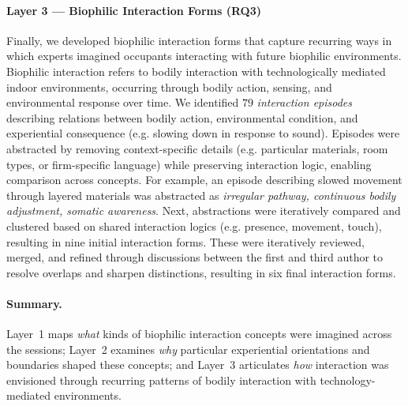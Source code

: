 \paragraph{Layer 3 — Biophilic Interaction Forms (RQ3)}
\label{subsec:ch5-layer3}
Finally, we developed biophilic interaction forms that capture recurring ways in which experts imagined occupants interacting with future biophilic environments. Biophilic interaction refers to bodily interaction with technologically mediated indoor environments, occurring through bodily action, sensing, and environmental response over time. We identified $79$ \emph{interaction episodes} describing relations between bodily action, environmental condition, and experiential consequence (e.g. slowing down in response to sound). Episodes were abstracted by removing context-specific details (e.g. particular materials, room types, or firm-specific language) while preserving interaction logic, enabling comparison across concepts. For example, an episode describing slowed movement through layered materials was abstracted as \textit{irregular pathway, continuous bodily adjustment, somatic awareness}. Next, abstractions were iteratively compared and clustered based on shared interaction logics (e.g. presence, movement, touch),  resulting in nine initial interaction forms. These were iteratively reviewed, merged, and refined through discussions between the first and third author to resolve overlaps and sharpen distinctions, resulting in six final interaction forms.



\paragraph{Summary.}
Layer~1 maps \emph{what} kinds of biophilic interaction concepts were imagined across the sessions; Layer~2 examines \emph{why} particular experiential orientations and boundaries shaped these concepts; and Layer~3 articulates \emph{how} interaction was envisioned through recurring patterns of bodily interaction with technology-mediated environments.
